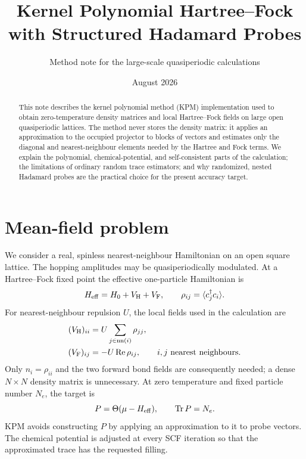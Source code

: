 \documentclass[11pt,a4paper]{article}
\title{Kernel Polynomial Hartree--Fock with Structured Hadamard Probes}
\author{Method note for the large-scale quasiperiodic calculations}
\date{August 2026}
\newcommand{\Tr}{\operatorname{Tr}}
\begin{document}
\maketitle

\begin{abstract}
This note describes the kernel polynomial method (KPM) implementation used to
obtain zero-temperature density matrices and local Hartree--Fock fields on
large open quasiperiodic lattices. The method never stores the density matrix:
it applies an approximation to the occupied projector to blocks of vectors and
estimates only the diagonal and nearest-neighbour elements needed by the
Hartree and Fock terms. We explain the polynomial, chemical-potential, and
self-consistent parts of the calculation; the limitations of ordinary random
trace estimators; and why randomized, nested Hadamard probes are the practical
choice for the present accuracy target.
\end{abstract}

\section{\hspace{0.5em}Mean-field problem}
We consider a real, spinless nearest-neighbour Hamiltonian on an open square
lattice. The hopping amplitudes may be quasiperiodically modulated. At a
Hartree--Fock fixed point the effective one-particle Hamiltonian is
\begin{equation}
 H_{\rm eff}=H_0+V_{\rm H}+V_{\rm F},\qquad
 \rho_{ij}=\langle c_j^\dagger c_i\rangle .
\end{equation}
For nearest-neighbour repulsion $U$, the local fields used in the calculation
are
\begin{align}
 (V_{\rm H})_{ii} &= U\sum_{j\in {\rm nn}(i)}\rho_{jj}, \\
 (V_{\rm F})_{ij} &= -U\,\mathrm{Re}\,\rho_{ij},
 \qquad i,j\text{ nearest neighbours}.
\end{align}
Only $n_i=\rho_{ii}$ and the two forward bond fields are consequently needed;
a dense $N\times N$ density matrix is unnecessary. At zero temperature and
fixed particle number $N_e$, the target is
\begin{equation}
 P=\Theta(\mu-H_{\rm eff}),\qquad \Tr P=N_e .
 \label{eq:projector}
\end{equation}
KPM avoids constructing $P$ by applying an approximation to it to probe
vectors. The chemical potential is adjusted at every SCF iteration so that the
approximated trace has the requested filling.
\end{document}
